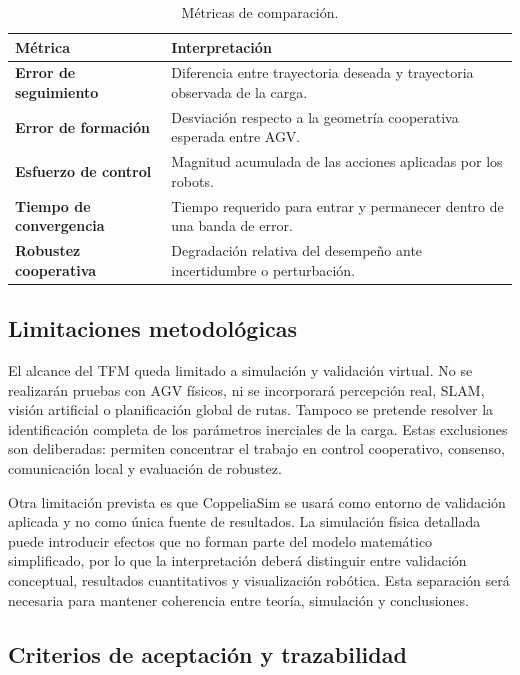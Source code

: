 \documentclass[12pt,a4paper]{article}
\begin{document}
\begin{table}[htbp]
\centering
\caption{Métricas de comparación.}
\begin{tabularx}{\textwidth}{>{\bfseries}p{}Y}
\toprule
Métrica & Interpretación \\
\midrule
Error de seguimiento & Diferencia entre trayectoria deseada y trayectoria observada de la carga. \\
Error de formación & Desviación respecto a la geometría cooperativa esperada entre AGV. \\
Esfuerzo de control & Magnitud acumulada de las acciones aplicadas por los robots. \\
Tiempo de convergencia & Tiempo requerido para entrar y permanecer dentro de una banda de error. \\
Robustez cooperativa & Degradación relativa del desempeño ante incertidumbre o perturbación. \\
\bottomrule
\end{tabularx}
\end{table}

\subsection{Limitaciones metodológicas}

El alcance del TFM queda limitado a simulación y validación virtual. No se realizarán pruebas con AGV físicos, ni se incorporará percepción real, SLAM, visión artificial o planificación global de rutas. Tampoco se pretende resolver la identificación completa de los parámetros inerciales de la carga. Estas exclusiones son deliberadas: permiten concentrar el trabajo en control cooperativo, consenso, comunicación local y evaluación de robustez.

Otra limitación prevista es que CoppeliaSim se usará como entorno de validación aplicada y no como única fuente de resultados. La simulación física detallada puede introducir efectos que no forman parte del modelo matemático simplificado, por lo que la interpretación deberá distinguir entre validación conceptual, resultados cuantitativos y visualización robótica. Esta separación será necesaria para mantener coherencia entre teoría, simulación y conclusiones.

\subsection{Criterios de aceptación y trazabilidad}
\end{document}
